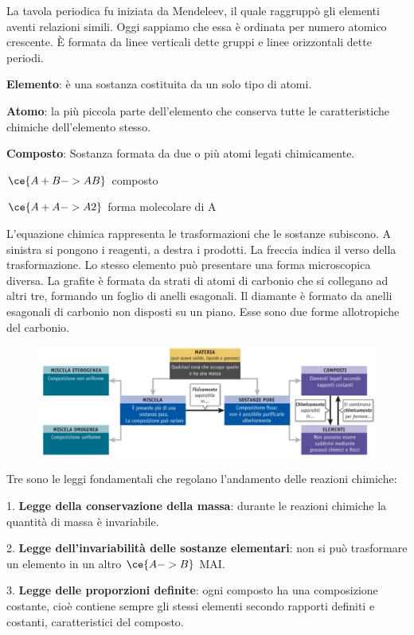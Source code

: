 La tavola periodica fu iniziata da Mendeleev, il quale raggruppò gli elementi aventi relazioni simili. Oggi sappiamo che essa è ordinata per numero atomico crescente. È formata da linee verticali dette gruppi e linee orizzontali dette periodi.

\textbf{Elemento}: è una sostanza costituita da un solo tipo di atomi.

\textbf{Atomo}: la più piccola parte dell'elemento che conserva tutte le
caratteristiche chimiche dell'elemento stesso.

\textbf{Composto}: Sostanza formata da due o più atomi legati
chimicamente.

\(\ce{ A + B -> AB }\) composto

\(\ce{ A + A -> A2 }\) forma molecolare di A

L’equazione chimica rappresenta le trasformazioni che le sostanze subiscono. A sinistra si pongono i reagenti, a destra i prodotti. La freccia indica il verso della trasformazione. Lo stesso elemento può presentare una forma microscopica diversa. La grafite è formata da strati di atomi di carbonio che si collegano ad altri tre, formando un foglio di anelli esagonali. Il diamante è formato da anelli esagonali di carbonio non disposti su un piano. Esse sono due forme allotropiche del carbonio.

\begin{figure}[htp]
    \centering
    \includegraphics[width=18cm]{immagini/materia.jpg}
\end{figure}

Tre sono le leggi fondamentali che regolano l'andamento delle reazioni chimiche:

1. \textbf{Legge della conservazione della massa}: durante le reazioni chimiche la quantità di massa è invariabile.

2. \textbf{Legge dell'invariabilità delle sostanze elementari}: non si può trasformare un elemento in un altro \(\ce{ A -> B }\) MAI.

3. \textbf{Legge delle proporzioni definite}: ogni composto ha una composizione costante, cioè contiene sempre gli stessi elementi secondo rapporti definiti e costanti, caratteristici del composto.

